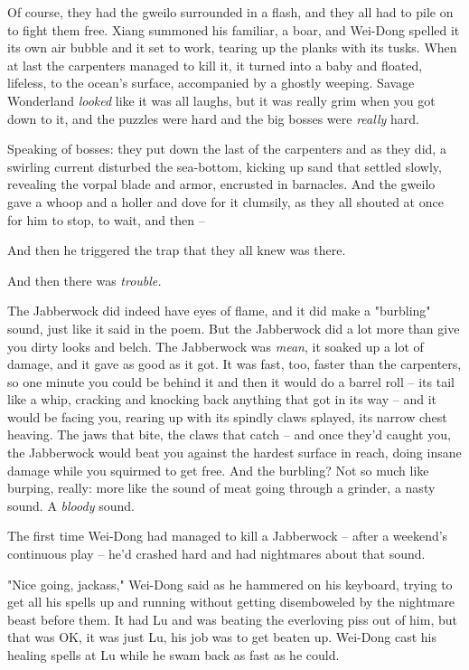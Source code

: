 Of course, they had the gweilo surrounded in a flash, and they all
had to pile on to fight them free. Xiang summoned his familiar, a
boar, and Wei-Dong spelled it its own air bubble and it set to
work, tearing up the planks with its tusks. When at last the
carpenters managed to kill it, it turned into a baby and floated,
lifeless, to the ocean's surface, accompanied by a ghostly weeping.
Savage Wonderland \emph{looked} like it was all laughs, but it was
really grim when you got down to it, and the puzzles were hard and
the big bosses were \emph{really} hard.

Speaking of bosses: they put down the last of the carpenters and as
they did, a swirling current disturbed the sea-bottom, kicking up
sand that settled slowly, revealing the vorpal blade and armor,
encrusted in barnacles. And the gweilo gave a whoop and a holler
and dove for it clumsily, as they all shouted at once for him to
stop, to wait, and then --

And then he triggered the trap that they all knew was there.

And then there was \emph{trouble.}

The Jabberwock did indeed have eyes of flame, and it did make a
"burbling" sound, just like it said in the poem. But the Jabberwock
did a lot more than give you dirty looks and belch. The Jabberwock
was \emph{mean}, it soaked up a lot of damage, and it gave as good
as it got. It was fast, too, faster than the carpenters, so one
minute you could be behind it and then it would do a barrel roll --
its tail like a whip, cracking and knocking back anything that got
in its way -- and it would be facing you, rearing up with its
spindly claws splayed, its narrow chest heaving. The jaws that
bite, the claws that catch -- and once they'd caught you, the
Jabberwock would beat you against the hardest surface in reach,
doing insane damage while you squirmed to get free. And the
burbling? Not so much like burping, really: more like the sound of
meat going through a grinder, a nasty sound. A \emph{bloody}
sound.

The first time Wei-Dong had managed to kill a Jabberwock -- after a
weekend's continuous play -- he'd crashed hard and had nightmares
about that sound.

"Nice going, jackass," Wei-Dong said as he hammered on his
keyboard, trying to get all his spells up and running without
getting disemboweled by the nightmare beast before them. It had Lu
and was beating the everloving piss out of him, but that was OK, it
was just Lu, his job was to get beaten up. Wei-Dong cast his
healing spells at Lu while he swam back as fast as he could.

